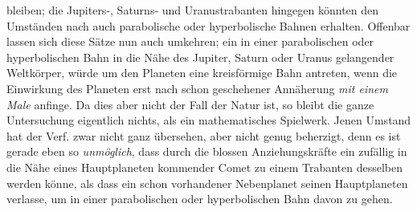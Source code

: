 bleiben; die Jupiters-, Saturns- und Uranustrabanten hingegen könnten den Umständen nach auch parabolische oder hyperbolische Bahnen erhalten. Offenbar lassen sich diese Sätze nun auch umkehren; ein in einer parabolischen oder hyperbolischen Bahn in die Nähe des Jupiter, Saturn oder Uranus gelangender Weltkörper, würde um den Planeten eine kreisförmige Bahn antreten, wenn die Einwirkung des Planeten erst nach schon geschehener Annäherung \emph{mit einem Male} anfinge. Da dies aber nicht der Fall der Natur ist, so bleibt die ganze Untersuchung eigentlich nichts, als ein mathematisches Spielwerk. Jenen Umstand hat der Verf. zwar nicht ganz übersehen, aber nicht genug beherzigt, denn es ist gerade eben so \emph{unmöglich}, dass durch die blossen Anziehungskräfte ein zufällig in die Nähe eines Hauptplaneten kommender Comet zu einem Trabanten desselben werden könne, als dass ein schon vorhandener Nebenplanet seinen Hauptplaneten verlasse, um in einer parabolischen oder hyperbolischen Bahn davon zu gehen.
